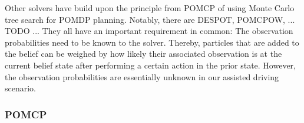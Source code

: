 





Other solvers have build upon the principle from POMCP of using Monte Carlo tree search for POMDP planning. 
Notably, there are DESPOT, POMCPOW, ... TODO ...
They all have an important requirement in common: The observation probabilities need to be known to the solver. Thereby, particles that are added to the belief can be weighed by how likely their associated observation is at the current belief state after performing a certain action in the prior state. However, the observation probabilities are essentially unknown in our assisted driving scenario. 


\subsubsection{POMCP}
\label{sec:pomcp}





